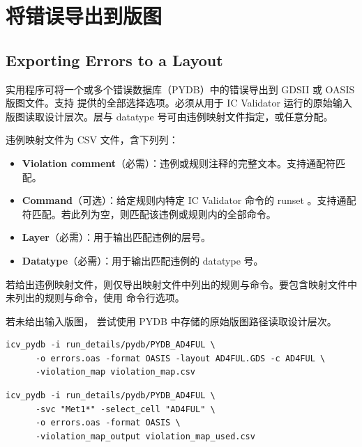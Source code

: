 \section{将错误导出到版图}
\subsection*{Exporting Errors to a Layout}

 实用程序可将一个或多个错误数据库（PYDB）中的错误导出到 GDSII 或 OASIS 版图文件。支持  提供的全部选择选项。必须从用于 IC Validator 运行的原始输入版图读取设计层次。层与 datatype 号可由违例映射文件指定，或任意分配。

违例映射文件为 CSV 文件，含下列列：
\begin{itemize}
  \item \textbf{Violation comment}（必需）：违例或规则注释的完整文本。支持通配符匹配。
  \item \textbf{Command}（可选）：给定规则内特定 IC Validator 命令的 runset 。支持通配符匹配。若此列为空，则匹配该违例或规则内的全部命令。
  \item \textbf{Layer}（必需）：用于输出匹配违例的层号。
  \item \textbf{Datatype}（必需）：用于输出匹配违例的 datatype 号。
\end{itemize}

若给出违例映射文件，则仅导出映射文件中列出的规则与命令。要包含映射文件中未列出的规则与命令，使用  命令行选项。

若未给出输入版图， 尝试使用 PYDB 中存储的原始版图路径读取设计层次。

\begin{lstlisting}[style=shell,caption={导出到 OASIS 的示例},label={ex:export-oasis}]
icv_pydb -i run_details/pydb/PYDB_AD4FUL \
      -o errors.oas -format OASIS -layout AD4FUL.GDS -c AD4FUL \
      -violation_map violation_map.csv
\end{lstlisting}

\begin{lstlisting}[style=shell,caption={带选择并创建含所用层与 datatype 的参考违例映射文件},label={ex:export-with-map}]
icv_pydb -i run_details/pydb/PYDB_AD4FUL \
      -svc "Met1*" -select_cell "AD4FUL" \
      -o errors.oas -format OASIS \
      -violation_map_output violation_map_used.csv
\end{lstlisting}

